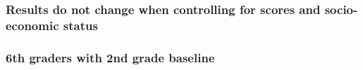\documentclass{beamer}
\begin{document}
\begin{frame}
    \label{frame:twfe_gpa_controls_siblings}
    \frametitle{Results do not change when controlling for scores and socio-economic status}
        {
    }

    \begin{flushleft}
        \hyperlink{frame:twfe_gpa_controls}{}
    \end{flushleft}       

\end{frame}

\begin{frame}
    \label{frame:twfe_gpa_controls_1}
    \frametitle{6th graders with 2nd grade baseline}
        {
    }

    \begin{flushleft}
        \hyperlink{frame:twfe_gpa_controls}{}
    \end{flushleft}       
\end{frame}
\end{document}
